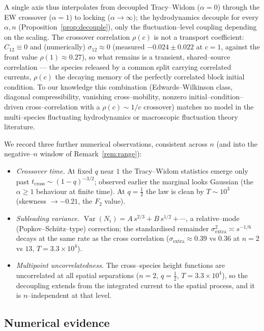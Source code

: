 \documentclass[11pt]{article}
\theoremstyle{plain}
\theoremstyle{definition}
\theoremstyle{remark}
\DeclareMathOperator{\Var}{Var}\DeclareMathOperator{\Cov}{Cov}
\begin{document}
\noindent A single axis thus interpolates from decoupled Tracy--Widom ($\alpha=0$)
through the EW crossover ($\alpha=1$) to locking ($\alpha\to\infty$); the hydrodynamics
decouple for every $\alpha,n$ (Proposition~\ref{prop:decouple}), only the
fluctuation--level coupling depending on the scaling. The crossover correlation
$\rho(c)$ is not a transport coefficient: $C_{12}\equiv0$ and (numerically)
$\sigma_{12}\approx0$ (measured $-0.024\pm0.022$ at $c=1$, against the front value
$\rho(1)\approx0.27$), so what remains is a transient, shared--source correlation --- the
species released by a common split carrying correlated currents, $\rho(c)$ the decaying
memory of the perfectly correlated block initial condition. To our knowledge this
combination (Edwards--Wilkinson class, diagonal compressibility, vanishing
cross--mobility, nonzero initial--condition--driven cross--correlation with a
$\rho(c)\sim1/c$ crossover) matches no model in the multi--species fluctuating
hydrodynamics or macroscopic fluctuation theory literature.

We record three further numerical observations, consistent across $n$ (and into the
negative--$n$ window of Remark~\ref{rem:range}):
\begin{itemize}
\item \emph{Crossover time.} At fixed $q$ near $1$ the Tracy--Widom statistics emerge only
past $t_{\mathrm{cross}}\sim(1-q)^{-3/2}$; observed earlier the marginal looks Gaussian
(the $\alpha\ge1$ behaviour at finite time). At $q=\tfrac12$ the law is clean by
$T\sim10^3$ (skewness $\to-0.21$, the $F_2$ value).
\item \emph{Subleading variance.} $\Var(N_i)=A\,s^{2/3}+B\,s^{1/2}+\cdots$, a
relative--mode (Popkov--Sch\"utz--type) correction; the standardised remainder
$\sigma_{\mathrm{extra}}^2\asymp s^{-1/6}$ decays at the same rate as the cross
correlation ($\sigma_{\mathrm{extra}}\approx0.39$ vs $0.36$ at $n=2$ vs $13$,
$T=3.3\times10^4$).
\item \emph{Multipoint uncorrelatedness.} The cross--species height functions are
uncorrelated at all spatial separations ($n=2$, $q=\tfrac12$, $T=3.3\times10^4$), so
the decoupling extends from the integrated current to the spatial process, and it is
$n$--independent at that level.
\end{itemize}

\subsection{Numerical evidence}\label{sec:numerics}
\end{document}

